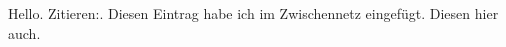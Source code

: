 \documentclass[11pt]{article}
\begin{document}
    Hello.
    Zitieren:\cite{CitekeyArticle}.
    Diesen Eintrag habe ich im Zwischennetz eingefügt.
    Diesen hier auch.
    
    
\end{document}
